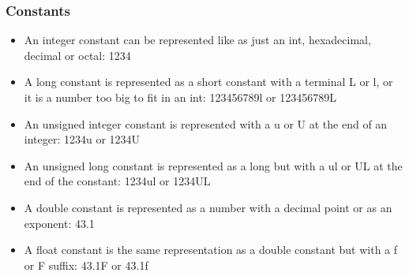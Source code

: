 \subsubsection{Constants}
\begin{itemize}[--]
	\item An integer constant can be represented like as just an int, hexadecimal, decimal or octal: 1234
	\item A long constant is represented as a short constant with a terminal L or l, or it is a number too big to fit in an int: 123456789l or 123456789L
	\item An unsigned integer constant is represented with a u or U at the end of an integer: 1234u or 1234U
	\item An unsigned long constant is represented as a long but with a ul or UL at the end of the constant: 1234ul or 1234UL
	\item A double constant is represented as a number with a decimal point or as an exponent: 43.1
	\item A float constant is the same representation as a double constant but with a f or F suffix: 43.1F or 43.1f
\end{itemize}
